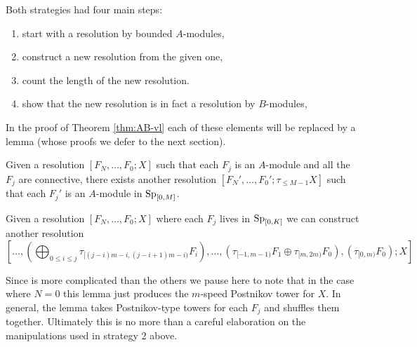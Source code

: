 
Both strategies had four main steps:
\begin{enumerate}
\item start with a resolution by bounded $A$-modules,
\item construct a new resolution from the given one,
\item count the length of the new resolution.
\item show that the new resolution is in fact a resolution by $B$-modules,
\end{enumerate}
In the proof of Theorem \ref{thm:AB-vl} each of these elements will be replaced by a lemma (whose proofs we defer to the next section).

\begin{lem}
  \label{lemm:resolution-prep}
  Given a resolution $[F_N,\dots,F_0; X]$ such that each $F_j$ is an $A$-module and all the $F_j$ are connective, there exists another resolution $[F_N',\dots,F_0'; \tau_{\leq M-1}X]$ such that each $F_j'$ is an $A$-module in $\operatorname{\mathrm{Sp}}_{[0,M]}$.
\end{lem}

\begin{lem}
  \label{lemm:new-resolution}
  Given a resolution $[F_N, \dots, F_0; X]$ where each $F_j$ lives in $\operatorname{\mathrm{Sp}}_{[0,K]}$
  we can construct another resolution
  $$ \left[ \dots, \left( \bigoplus_{0 \leq i \leq j} \tau_{[(j-i)m-i,(j-i+1)m-i)}F_i \right) , \dots, \left( \tau_{[-1,m-1)}F_1  \oplus  \tau_{[m,2m)}F_0 \right) , \left( \tau_{[0,m)}F_0 \right) ; X \right] $$
\end{lem}

\begin{rmk}
  Since  is more complicated than the others we pause here to note that in the case where $N=0$ this lemma just produces the $m$-speed Postnikov tower for $X$.
  In general, the lemma takes Postnikov-type towers for each $F_j$ and shuffles them together.
  Ultimately this is no more than a careful elaboration on the manipulations used in strategy 2 above.
\end{rmk}

